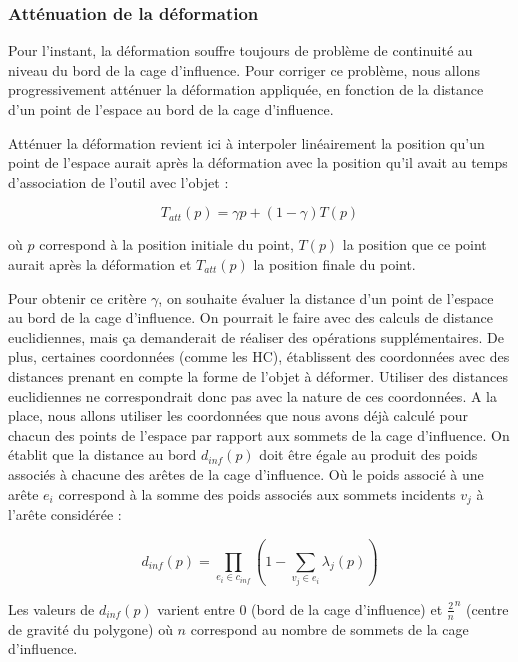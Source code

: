 \subsubsection{Atténuation de la déformation}

Pour l'instant, la déformation souffre toujours de problème de continuité au
niveau du bord de la cage d'influence. Pour corriger ce problème, nous allons
progressivement atténuer la déformation appliquée, en fonction de la distance
d'un point de l'espace au bord de la cage d'influence.

Atténuer la déformation revient ici à interpoler linéairement la position
qu'un point de l'espace aurait après la déformation avec la position qu'il
avait au temps d'association de l'outil avec l'objet :

\begin{equation}
  T_{att}(p) = \gamma p + (1-\gamma) T(p)
\end{equation}

où $p$ correspond à la position initiale du point, $T(p)$ la position que ce
point aurait après la déformation et $T_{att}(p)$ la position finale du point.

Pour obtenir ce critère $\gamma$, on souhaite évaluer la distance d'un point
de l'espace au bord de la cage d'influence. On pourrait le faire avec des
calculs de distance euclidiennes, mais ça demanderait de réaliser des
opérations supplémentaires. De plus, certaines coordonnées (comme les HC),
établissent des coordonnées avec des distances prenant en compte la forme de
l'objet à déformer. Utiliser des distances euclidiennes ne correspondrait donc
pas avec la nature de ces coordonnées. A la place, nous allons utiliser les
coordonnées que nous avons déjà calculé pour chacun des points de l'espace par
rapport aux sommets de la cage d'influence. On établit que la distance au bord
$d_{inf}(p)$ doit être égale au produit des poids associés à chacune des
arêtes de la cage d'influence. Où le poids associé à une arête $e_i$
correspond à la somme des poids associés aux sommets incidents $v_j$ à l'arête
considérée :

\begin{equation}
  d_{inf}(p) = \prod_{e_i \in c_{inf}} (1 - \sum_{v_j \in e_i} \lambda_j(p))
\end{equation}

Les valeurs de $d_{inf}(p)$ varient entre 0 (bord de la cage d'influence) et
$\frac{2}{n}^n$ (centre de gravité du polygone) où $n$ correspond au nombre de
sommets de la cage d'influence.

